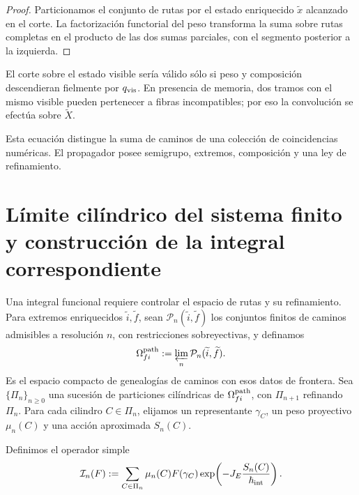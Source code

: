 \begin{proof}
Particionamos el conjunto de rutas por el estado enriquecido
\(\widetilde x\) alcanzado en el corte.
La factorización functorial del peso transforma la suma sobre rutas completas
en el producto de las dos sumas parciales, con el segmento posterior a la
izquierda.
\end{proof}

El corte sobre el estado visible sería válido sólo si peso y composición
descendieran fielmente por \(q_{\rm vis}\). En presencia de memoria, dos
tramos con el mismo visible pueden pertenecer a fibras incompatibles; por eso
la convolución se efectúa sobre \(\widetilde X\).

Esta ecuación distingue la suma de caminos de una colección de coincidencias
numéricas. El propagador posee semigrupo, extremos, composición y una ley de
refinamiento.

\section{Límite cilíndrico del sistema finito y construcción de la integral correspondiente}

Una integral funcional requiere controlar el espacio de rutas y su
refinamiento. Para extremos enriquecidos \(\widetilde i,\widetilde f\), sean
\(\mathcal P_n(\widetilde i,\widetilde f)\) los conjuntos finitos de caminos
admisibles a resolución \(n\), con restricciones sobreyectivas, y definamos
\[
 \Omega_{fi}^{\rm path}
 :=\varprojlim_n\mathcal P_n(\widetilde i,\widetilde f).
\]
Es el espacio compacto de genealogías de caminos con esos datos de frontera.
Sea \(\{\Pi_n\}_{n\geq0}\) una sucesión de particiones cilíndricas de
\(\Omega_{fi}^{\rm path}\), con \(\Pi_{n+1}\) refinando \(\Pi_n\). Para cada
cilindro \(C\in\Pi_n\), elijamos un representante
\(\gamma_C\), un peso proyectivo \(\mu_n(C)\) y una acción aproximada
\(S_n(C)\).

Definimos el operador simple
\begin{equation}
 \mathcal I_n(F)
 :=\sum_{C\in\Pi_n}
   \mu_n(C)
   F(\gamma_C)
   \exp\!\left(-J_E\frac{S_n(C)}{\hbar_{\rm int}}\right).
 \label{eq:integral-cilindrica-n}
\end{equation}

